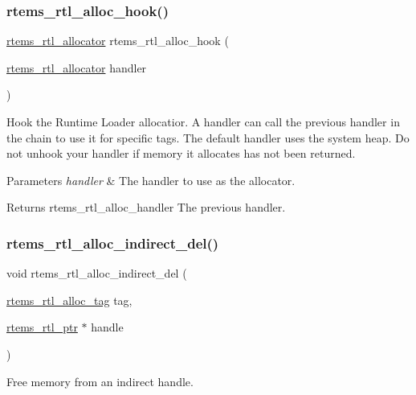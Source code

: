 \subsubsection{\texorpdfstring{rtems\_rtl\_alloc\_hook()}{rtems\_rtl\_alloc\_hook()}}
{\footnotesize\ttfamily \mbox{\hyperlink{rtl-allocator_8h_aa8af44a7337cfbfe72b669c82a604bb7}{rtems\+\_\+rtl\+\_\+allocator}} rtems\+\_\+rtl\+\_\+alloc\+\_\+hook (\begin{DoxyParamCaption}\item[{\mbox{\hyperlink{rtl-allocator_8h_aa8af44a7337cfbfe72b669c82a604bb7}{rtems\+\_\+rtl\+\_\+allocator}}}]{handler }\end{DoxyParamCaption})}

Hook the Runtime Loader allocatior. A handler can call the previous handler in the chain to use it for specific tags. The default handler uses the system heap. Do not unhook your handler if memory it allocates has not been returned.


\begin{DoxyParams}{Parameters}
{\em handler} & The handler to use as the allocator. \\
\hline
\end{DoxyParams}
\begin{DoxyReturn}{Returns}
rtems\+\_\+rtl\+\_\+alloc\+\_\+handler The previous handler. 
\end{DoxyReturn}
\mbox{\label{rtl-allocator_8h_ad8518f137454a1a316fc21d335af10c9}} 
\subsubsection{\texorpdfstring{rtems\_rtl\_alloc\_indirect\_del()}{rtems\_rtl\_alloc\_indirect\_del()}}
{\footnotesize\ttfamily void rtems\+\_\+rtl\+\_\+alloc\+\_\+indirect\+\_\+del (\begin{DoxyParamCaption}\item[{\mbox{\hyperlink{rtl-allocator_8h_a445a8615118b7fc14005ab20583153fd}{rtems\+\_\+rtl\+\_\+alloc\+\_\+tag}}}]{tag,  }\item[{\mbox{\hyperlink{structrtems__rtl__ptr}{rtems\+\_\+rtl\+\_\+ptr}} $\ast$}]{handle }\end{DoxyParamCaption})}

Free memory from an indirect handle.


